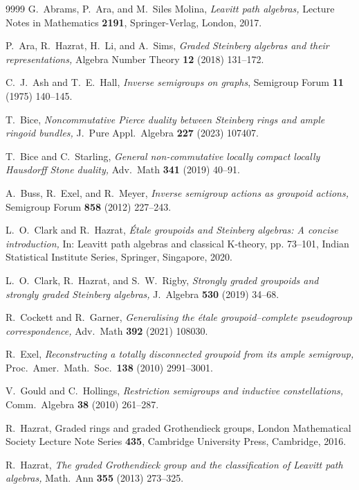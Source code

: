 \documentclass[a4paper,reqno,12pt]{amsart}
\numberwithin{equation}{section}
\theoremstyle{plain}
\theoremstyle{definition}
\begin{document}
\begin{thebibliography}{9999}
 G.\ Abrams, P.\ Ara, and M.\ Siles Molina, \emph{Leavitt path algebras,}
Lecture Notes in Mathematics \textbf{2191}, Springer-Verlag, London, 2017.

 P.\ Ara, R.\ Hazrat, H.\ Li, and A.\ Sims, \textit{Graded Steinberg algebras and their representations,} Algebra Number Theory \textbf{12} (2018) 131--172. 

 C.\ J.\ Ash and T.\ E.\ Hall, \textit{Inverse semigroups on graphs}, Semigroup Forum \textbf{11} (1975) 140--145.

 T.\ Bice, \textit{Noncommutative Pierce duality between Steinberg rings and ample ringoid bundles,} J.\ Pure Appl.\ Algebra \textbf{227} (2023) 107407.

 T.\ Bice and C.\ Starling, \textit{General non-commutative locally compact locally Hausdorff Stone duality,} Adv.\ Math \textbf{341} (2019) 40--91.

 A.\ Buss, R.\ Exel, and R.\ Meyer, \textit{Inverse semigroup actions as groupoid actions,} Semigroup Forum \textbf{858} (2012) 227--243.

 L.\ O.\ Clark and R.\ Hazrat, \textit{\'Etale groupoids and Steinberg algebras: A concise introduction,} In: Leavitt path algebras and classical K-theory, pp. 73--101, Indian Statistical Institute Series, Springer, Singapore, 2020. 

 L.\ O.\ Clark, R.\ Hazrat, and S.\ W.\ Rigby, \textit{Strongly graded groupoids and strongly graded Steinberg algebras,} J.\ Algebra \textbf{530} (2019) 34--68.

 R.\ Cockett and R.\ Garner, \textit{Generalising the \'etale groupoid–complete pseudogroup correspondence,} Adv.\ Math \textbf{392} (2021) 108030.

 R.\ Exel, \textit{Reconstructing a totally disconnected groupoid from its ample semigroup,} Proc.\ Amer.\ Math.\ Soc.\ \textbf{138} (2010) 2991--3001.

 V.\ Gould and C.\ Hollings, \textit{Restriction semigroups and inductive constellations,} Comm.\ Algebra \textbf{38} (2010) 261--287.

 R.\ Hazrat, Graded rings and graded Grothendieck groups, London Mathematical Society Lecture Note Series \textbf{435}, Cambridge University Press, Cambridge, 2016.

 R.\ Hazrat, \textit{The graded Grothendieck group and the classification of Leavitt path algebras,} Math.\ Ann \textbf{355} (2013) 273--325.


\end{thebibliography}
\end{document}
